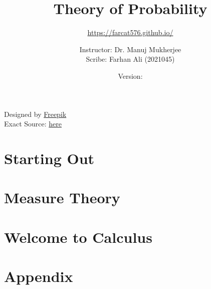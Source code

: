 \documentclass[11pt,twoside=semi,openright,numbers=noenddot,titlepage=false]{scrbook}
\title{Theory of Probability}
\subtitle{\url{https://farcat576.github.io/}}
\author{Instructor: Dr. Manuj Mukherjee \\ Scribe: Farhan Ali (2021045)}
\date{Version: \napkinversion}
\begin{document}
\frontmatter
\maketitle

\bgroup
\fboxrule=4pt
\noindent{}
\begin{center}
	Designed by \href{www.freepik.com}{Freepik} \\
	Exact Source: \href{https://www.freepik.com/free-photo/closeup-abstract-watercolor-background_2768350.htm#fromView=image_search&page=1&position=24&uuid=895fbb9c-0a69-4bd5-ac86-3b253fd9093b}{here}
\end{center}
\egroup
\newpage




\setcounter{chapter}{-1} %


\cleardoublepage
{}
\setcounter{temppage}{\value{page}}
\mainmatter
\setcounter{page}{\value{temppage}}

\tableofcontents


\part{Starting Out}
\label{part:startout}
\parttoc
\setcounter{chapter}{-1} %



\part{Measure Theory}
\label{part:measure}
\parttoc

\part{Welcome to Calculus}
\label{part:calc}
\parttoc

\part{Appendix}
\parttoc
\appendix







\backmatter

\clearpage
\printbibliography[type=image,title={Image Attributions}]
\printbibliography[nottype=image]
\end{document}
